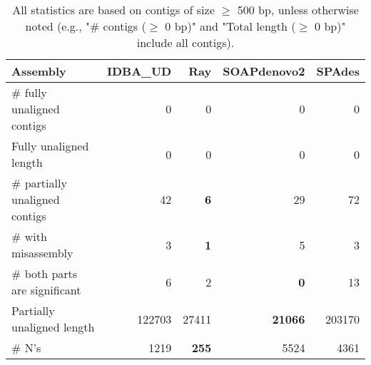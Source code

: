 \documentclass[12pt,a4paper]{article}
\begin{document}
\begin{table}[ht]
\begin{center}
\caption{All statistics are based on contigs of size $\geq$ 500 bp, unless otherwise noted (e.g., "\# contigs ($\geq$ 0 bp)" and "Total length ($\geq$ 0 bp)" include all contigs).}
\begin{tabular}{|l*{4}{|r}|}
\hline
Assembly & IDBA\_UD & Ray & SOAPdenovo2 & SPAdes \\ \hline
\# fully unaligned contigs & 0 & 0 & 0 & 0 \\ \hline
Fully unaligned length & 0 & 0 & 0 & 0 \\ \hline
\# partially unaligned contigs & 42 & {\bf 6} & 29 & 72 \\ \hline
\hspace{5mm}\# with misassembly & 3 & {\bf 1} & 5 & 3 \\ \hline
\hspace{5mm}\# both parts are significant & 6 & 2 & {\bf 0} & 13 \\ \hline
Partially unaligned length & 122703 & 27411 & {\bf 21066} & 203170 \\ \hline
\# N's & 1219 & {\bf 255} & 5524 & 4361 \\ \hline
\end{tabular}
\end{center}
\end{table}
\end{document}
